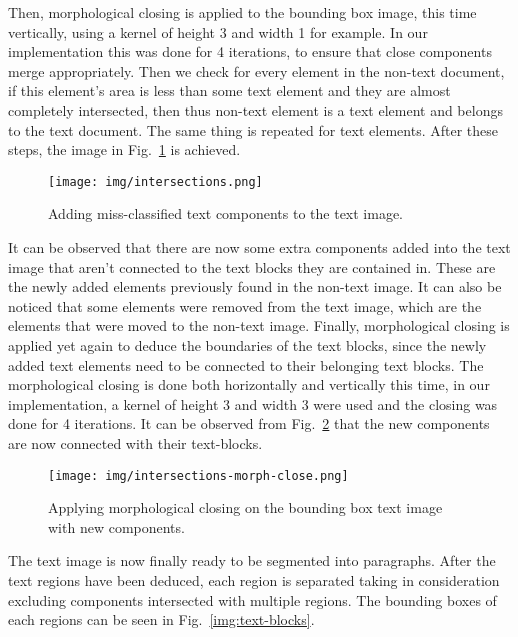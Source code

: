 \documentclass[conference]{IEEEtran}
\begin{document}
    Then, morphological closing is applied to the bounding box image, this time vertically, using a kernel of
    height 3 and width 1 for example.
    In our implementation this was done for 4 iterations, to ensure that close components merge appropriately.
    Then we check for every element in the non-text document, if this element's area is less than some
    text element and they are almost completely intersected, then thus non-text element is a text element
    and belongs to the text document.
    The same thing is repeated for text elements.
    After these steps, the image in Fig.~\ref{img:intersections} is achieved.
    
    \begin{figure}[htbp]
        \centerline{\texttt{[image: img/intersections.png]}}
        \caption{Adding miss-classified text components to the text image.}
        \label{img:intersections}
    \end{figure}

    It can be observed that there are now some extra components added into the text image
    that aren't connected to the text blocks they are contained in.
    These are the newly added elements previously found in the non-text image.
    It can also be noticed that some elements were removed from the text image, which
    are the elements that were moved to the non-text image.
    Finally, morphological closing is applied yet again to deduce the boundaries of the text blocks,
    since the newly added text elements need to be connected to their belonging text blocks.
    The morphological closing is done both horizontally and vertically this time, in our implementation,
    a kernel of height 3 and width 3 were used and the closing was done for 4 iterations.
    It can be observed from Fig.~\ref{img:intersections-morph-close} that the new components are now
    connected with their text-blocks.

    \begin{figure}[htbp]
        \centerline{\texttt{[image: img/intersections-morph-close.png]}}
        \caption{Applying morphological closing on the bounding box text image with new components.}
        \label{img:intersections-morph-close}
    \end{figure}

    The text image is now finally ready to be segmented into paragraphs.
    After the text regions have been deduced, each region is separated taking in consideration
    excluding components intersected with multiple regions.
    The bounding boxes of each regions can be seen in Fig.~\ref{img:text-blocks}.
\end{document}
